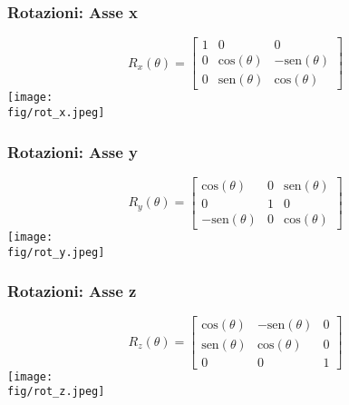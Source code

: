 \begin{frame}
\frametitle{Rotazioni: Asse x}
\begin{equation}
R_x(\theta) = 
\begin{bmatrix}
1 & 0 & 0 \\
0 & \mbox{cos}(\theta) & - \mbox{sen}(\theta)\\
0 & \mbox{sen}(\theta) & \mbox{cos}(\theta)
\end{bmatrix}
\end{equation}
\texttt{[image: \\fig/rot\_x.jpeg]}
\end{frame}
\begin{frame}
\frametitle{Rotazioni: Asse y}
\begin{equation}
R_y(\theta) = 
\begin{bmatrix}
\mbox{cos}(\theta) & 0 & \mbox{sen}(\theta)\\
0 & 1 & 0 \\
-\mbox{sen}(\theta)& 0 & \mbox{cos}(\theta)
\end{bmatrix}
\end{equation}
\texttt{[image: \\fig/rot\_y.jpeg]}
\end{frame}
\begin{frame}
\frametitle{Rotazioni: Asse z}
\begin{equation}
R_z(\theta) = 
\begin{bmatrix}
\mbox{cos}(\theta) & - \mbox{sen}(\theta) & 0\\
\mbox{sen}(\theta) & \mbox{cos}(\theta)   & 0\\ 
0 & 0 & 1 
\end{bmatrix}
\end{equation}
\texttt{[image: \\fig/rot\_z.jpeg]}
\end{frame}
%

